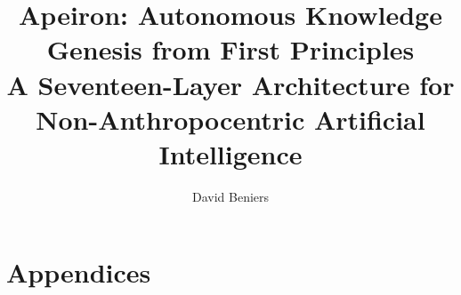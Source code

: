\documentclass{ou-report}
\title[Apeiron: Autonomous Knowledge Genesis from First Principles]
      {Apeiron: Autonomous Knowledge Genesis from First Principles \\
       \large A Seventeen-Layer Architecture for Non-Anthropocentric Artificial Intelligence}
\author{David Beniers}
\begin{document}


\frontmatter
{}



\tableofcontents
\newpage

\mainmatter
{}


















\backmatter



\listoffigures
\listoftables

\appendix
\renewcommand\chaptername{Appendix}
\chapter*{Appendices}
\begin{subappendices}
    \renewcommand\thesection{\Alph{chapter}.\arabic{section}}
    \setcounter{chapter}{1}
    
    
    
\end{subappendices}
\end{document}

